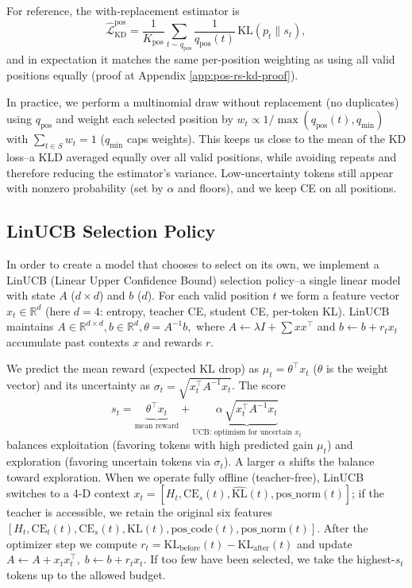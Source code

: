 \documentclass[11pt]{article}
\begin{document}
For reference, the with-replacement estimator is
\[
	\widehat{\mathcal{L}}_{\text{KD}}^{\text{pos}}
	=\frac{1}{K_{\text{pos}}}\sum_{t\sim q_{\text{pos}}}\frac{1}{q_{\text{pos}}(t)}
	\,\mathrm{KL}(p_t\|s_t),
\]
and in expectation it matches the same per-position weighting as using all valid positions equally (proof at Appendix \ref{app:pos-rs-kd-proof}).

In practice, we perform a multinomial draw without replacement (no duplicates) using $q_{\text{pos}}$ and weight each selected position by
$w_t \propto 1/\max(q_{\text{pos}}(t),q_{\min})$ with $\sum_{t\in S} w_t=1$ ($q_{\min}$ caps weights).
This keeps us close to the mean of the KD loss--a KLD averaged equally over all valid positions, while avoiding repeats and therefore reducing the estimator's variance.
Low-uncertainty tokens still appear with nonzero probability (set by $\alpha$ and floors), and we keep CE on all positions.

\subsection{LinUCB Selection Policy}
In order to create a model that chooses to select on its own, we implement a LinUCB (Linear Upper Confidence Bound) selection policy--a single linear model with state $A$ ($d{\times}d$) and $b$ ($d$).
For each valid position $t$ we form a feature vector $x_t\in\mathbb{R}^d$ (here $d{=}4$: entropy, teacher CE, student CE, per-token KL).
LinUCB maintains
\(
A\in\mathbb{R}^{d\times d}, b\in\mathbb{R}^d,
\theta=A^{-1}b,
\)
where $A\!\leftarrow\!\lambda I+\sum x x^\top$ and $b\!\leftarrow\!b+r_tx_t$ accumulate past contexts $x$ and rewards $r$.

We predict the mean reward (expected KL drop) as $\mu_t=\theta^\top x_t$ ($\theta$ is the weight vector) and its uncertainty as
$\sigma_t=\sqrt{x_t^\top A^{-1}x_t}$. The score
\[
	s_t=\underbrace{\theta^\top x_t}_{\text{mean reward}}
	+\underbrace{\alpha\,\sqrt{x_t^\top A^{-1}x_t}}_{\text{UCB: optimism for uncertain }x_t}
\]
balances exploitation (favoring tokens with high predicted gain \(\mu_t\)) and exploration (favoring uncertain tokens via \(\sigma_t\)). A larger \(\alpha\) shifts the balance toward exploration.
When we operate fully offline (teacher-free), LinUCB switches to a 4-D context $x_t=[H_t,\text{CE}_s(t),\widehat{\text{KL}}(t),\text{pos\_norm}(t)]$; if the teacher is accessible, we retain the original six features $[H_t,\text{CE}_t(t),\text{CE}_s(t),\text{KL}(t),\text{pos\_code}(t),\text{pos\_norm}(t)]$.
After the optimizer step we compute $r_t=\mathrm{KL}_{\text{before}}(t)-\mathrm{KL}_{\text{after}}(t)$ and update
$A\!\leftarrow\!A+x_tx_t^\top,\; b\!\leftarrow\!b+r_tx_t$.
If too few have been selected, we take the highest-$s_t$ tokens up to the allowed budget.
\end{document}

